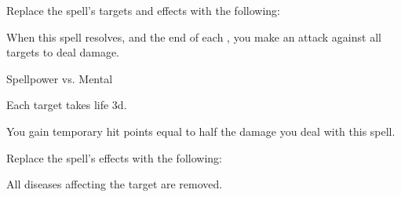 Replace the spell's targets and effects with the following:
\begin{spellcontent}

\begin{augmenttargetinginfo}




\end{augmenttargetinginfo}


\begin{augmenteffects}



\spelleffect
When this spell resolves, and the end of each , you make an attack against all targets to deal damage.




\begin{spellattack}{Spellpower vs. Mental}


\spellsuccess
Each target takes life  \minus3d.



\end{spellattack}





\end{augmenteffects}

\end{spellcontent}






You gain temporary hit points equal to half the damage you deal with this spell.









Replace the spell's effects with the following:
\begin{spellcontent}

\begin{augmenteffects}



\spelleffect
All diseases affecting the target are removed.








\end{augmenteffects}

\end{spellcontent}





